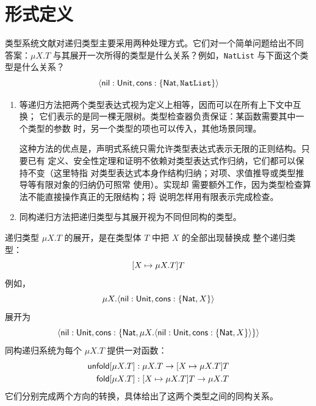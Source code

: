 \section{形式定义}
\label{sec:20.2}

类型系统文献对递归类型主要采用两种处理方式。它们对一个简单问题给出不同
答案：\(\mu X.T\) 与其展开一次所得的类型是什么关系？例如，\texttt{NatList}
与下面这个类型是什么关系？
\[
\langle\mathsf{nil}:\mathsf{Unit},
        \mathsf{cons}:\{\mathsf{Nat},\texttt{NatList}\}\rangle
\]

\begin{enumerate}
\item 等递归方法把两个类型表达式视为定义上相等，因而可以在所有上下文中互换；
它们表示的是同一棵无限树。类型检查器负责保证：某函数需要其中一个类型的参数
时，另一个类型的项也可以传入，其他场景同理。

这种方法的优点是，声明式系统只需允许类型表达式表示无限的正则结构。只要已有
定义、安全性定理和证明不依赖对类型表达式作归纳，它们都可以保持不变（这里特指
对类型表达式本身作结构归纳；对项、求值推导或类型推导等有限对象的归纳仍可照常
使用）。实现却
需要额外工作，因为类型检查算法不能直接操作真正的无限结构；将
说明怎样用有限表示完成检查。

\item 同构递归方法把递归类型与其展开视为不同但同构的类型。
\end{enumerate}

递归类型 \(\mu X.T\) 的展开，是在类型体 \(T\) 中把 \(X\) 的全部出现替换成
整个递归类型：
\[
[X\mapsto \mu X.T]T
\]
例如，
\[
\mu X.\langle\mathsf{nil}:\mathsf{Unit},
              \mathsf{cons}:\{\mathsf{Nat},X\}\rangle
\]
展开为
\[
\langle\mathsf{nil}:\mathsf{Unit},
\mathsf{cons}:\{\mathsf{Nat},
\mu X.\langle\mathsf{nil}:\mathsf{Unit},
\mathsf{cons}:\{\mathsf{Nat},X\}\rangle\}\rangle
\]
同构递归系统为每个 \(\mu X.T\) 提供一对函数：
\[
\begin{aligned}
\mathsf{unfold}[\mu X.T]&:\mu X.T\to[X\mapsto \mu X.T]T\\
\mathsf{fold}[\mu X.T]&:[X\mapsto \mu X.T]T\to\mu X.T
\end{aligned}
\]
它们分别完成两个方向的转换，具体给出了这两个类型之间的同构关系。

\begin{center}
\end{center}

